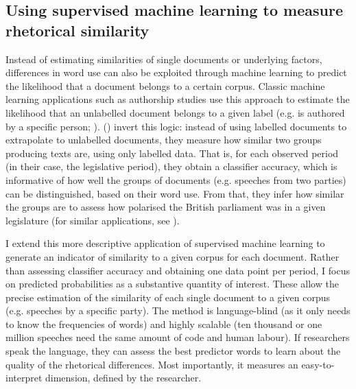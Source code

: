 \documentclass{article}
\begin{document}
\subsection{Using supervised machine learning to measure rhetorical similarity}
\label{sec:method}

Instead of estimating similarities of single documents or underlying factors, differences in word use can also be exploited through machine learning to predict the likelihood that a document belongs to a certain corpus. Classic machine learning applications such as authorship studies use this approach to estimate the likelihood that an unlabelled document belongs to a given label (e.g. is authored by a specific person; \cite{Mosteller1963}). \citeauthor{Peterson2018} (\citeyear{Peterson2018}) invert this logic: instead of using labelled documents to extrapolate to unlabelled documents, they measure how similar two groups producing texts are, using only labelled data. That is, for each observed period (in their case, the legislative period), they obtain a classifier accuracy, which is informative of how well the groups of documents (e.g. speeches from two parties) can be distinguished, based on their word use. From that, they infer how similar the groups are to assess how polarised the British parliament was in a given legislature (for similar applications, see \cite{Gentzkow2019, Goet2019}).\par 

I extend this more descriptive application of supervised machine learning to generate an indicator of similarity to a given corpus for each document. Rather than assessing classifier accuracy and obtaining one data point per period, I focus on predicted probabilities as a substantive quantity of interest. These allow the precise estimation of the similarity of each single document to a given corpus (e.g. speeches by a specific party). The method is language-blind (as it only needs to know the frequencies of words) and highly scalable (ten thousand or one million speeches need the same amount of code and human labour). If researchers speak the language, they can assess the best predictor words to learn about the quality of the rhetorical differences. Most importantly, it measures an easy-to-interpret dimension, defined by the researcher. \par
\end{document}
